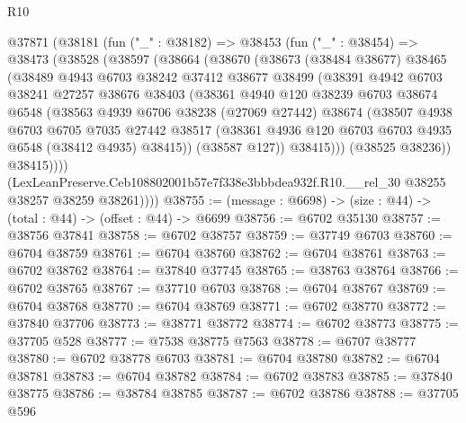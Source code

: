 \begin{lexlean}{R10}
\begin{coremodule}
  @37871
    (@38181
      (fun ("_" : @38182) =>
      @38453
        (fun ("_" : @38454) =>
        @38473
          (@38528
            (@38597
              (@38664
                (@38670
                  (@38673
                    (@38484 @38677)
                    @38465
                    (@38489
                      @4943
                      @6703
                      @38242
                      @37412
                      @38677
                      @38499
                      (@38391
                        @4942
                        @6703
                        @38241
                        @27257
                        @38676
                        @38403
                        (@38361
                          @4940
                          @120
                          @38239
                          @6703
                          @38674
                          @6548
                          (@38563
                            @4939
                            @6706
                            @38238
                            (@27069 @27442)
                            @38674
                            (@38507
                              @4938
                              @6703
                              @6705
                              @7035
                              @27442
                              @38517
                              (@38361 @4936 @120 @6703 @6703 @4935 @6548 (@38412 @4935) @38415))
                            (@38587 @127))
                          @38415)))
                    (@38525 @38236))
                  @38415))))
          (LexLeanPreserve.Ceb108802001b57e7f338e3bbbdea932f.R10.__rel_30
            @38255
            @38257
            @38259
            @38261))))
@38755 := (message : @6698) -> (size : @44) -> (total : @44) -> (offset : @44) -> @6699
@38756 := @6702 @35130
@38757 := @38756 @37841
@38758 := @6702 @38757
@38759 := @37749 @6703
@38760 := @6704 @38759
@38761 := @6704 @38760
@38762 := @6704 @38761
@38763 := @6702 @38762
@38764 := @37840 @37745
@38765 := @38763 @38764
@38766 := @6702 @38765
@38767 := @37710 @6703
@38768 := @6704 @38767
@38769 := @6704 @38768
@38770 := @6704 @38769
@38771 := @6702 @38770
@38772 := @37840 @37706
@38773 := @38771 @38772
@38774 := @6702 @38773
@38775 := @37705 @528
@38777 := @7538 @38775 @7563
@38778 := @6707 @38777
@38780 := @6702 @38778 @6703
@38781 := @6704 @38780
@38782 := @6704 @38781
@38783 := @6704 @38782
@38784 := @6702 @38783
@38785 := @37840 @38775
@38786 := @38784 @38785
@38787 := @6702 @38786
@38788 := @37705 @596

\end{coremodule}
\end{lexlean}
